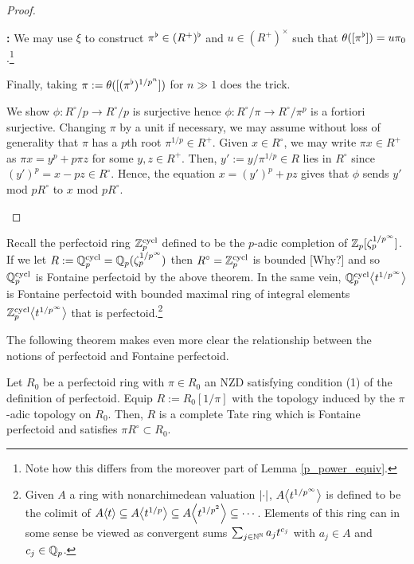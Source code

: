 \documentclass[11pt]{article}
\DeclareMathOperator{\cycl}{cycl}
\begin{document}
\begin{proof}
\begin{enum}{\alph}
\begin{enum}{\arabic}
\textbf{:} We may use $\xi$ to construct $\pi^{\flat}\in(R^+)^{\flat}$ and $u\in(R^+)^{\times}$ such that $\theta([\pi^{\flat}])=u\pi_0$.\footnote{Note how this differs from the moreover part of Lemma \ref{p_power_equiv}.} 

Finally, taking $\pi:=\theta([(\pi^{\flat})^{1/p^n}])$ for $n\gg1$ does the trick.

\item We show $\phi: R^{\circ}/p\to R^{\circ}/p$ is surjective hence $\phi: R^{\circ}/\pi\to R^{\circ}/\pi^p$ is a fortiori surjective. Changing $\pi$ by a unit if necessary, we may assume without loss of generality that $\pi$ has a $p$th root $\pi^{1/p}\in R^+$. Given $x\in R^{\circ}$, we may write $\pi x\in R^+$ as $\pi x=y^p+p\pi z$ for some $y,z\in R^+$. Then, $y':=y/\pi^{1/p}\in R$ lies in $R^{\circ}$ since $(y')^p=x-pz\in R^{\circ}$. Hence, the equation $x=(y')^p+pz$ gives that $\phi$ sends $y'$ mod $pR^{\circ}$ to $x$ mod $pR^{\circ}$. \qedhere
\end{enum}
\end{enum}
\end{proof}

\begin{example}
Recall the perfectoid ring $\Z_p^{\cycl}$ defined to be the $p$-adic completion of $\mathbb{Z}_p[\zeta_p^{1/p^{\infty}}]$. If we let $R:=\Q_p^{\cycl}=\Q_p(\zeta_p^{1/p^{\infty}})$ then $R^{\circ}=\Z_p^{\cycl}$ is bounded [Why?] and so $\Q_p^{\cycl}$ is Fontaine perfectoid by the above theorem. In the same vein, $\Q_p^{\cycl}\ip{t^{1/p^{\infty}}}$ is Fontaine perfectoid with bounded maximal ring of integral elements $\Z_p^{\cycl}\ip{t^{1/p^{\infty}}}$ that is perfectoid.\footnote{Given $A$ a ring with nonarchimedean valuation $\left\lvert\cdot\right\rvert$, $A\!\left\langle t^{1/p^{\infty}}\right\rangle$ is defined to be the colimit of $A\!\left\langle t\right\rangle\subseteq A\!\left\langle t^{1/p}\right\rangle\subseteq A\!\left\langle t^{1/p^2}\right\rangle\subseteq\cdots$. Elements of this ring can in some sense be viewed as convergent sums $\sum_{j\in\mathbb{N}^{\mathbb{N}}}a_jt^{c_j}$ with $a_j\in A$ and $c_j\in\mathbb{Q}_p$.}
\end{example}

The following theorem makes even more clear the relationship between the notions of perfectoid and Fontaine perfectoid.

\begin{theorem}
Let $R_0$ be a perfectoid ring with $\pi\in R_0$ an NZD satisfying condition \textup{(1)} of the definition of perfectoid. Equip $R:=R_0[1/\pi]$ with the topology induced by the $\pi$-adic topology on $R_0$. Then, $R$ is a complete Tate ring which is Fontaine perfectoid and satisfies $\pi R^{\circ}\subset R_0$.
\end{theorem}
\end{document}
